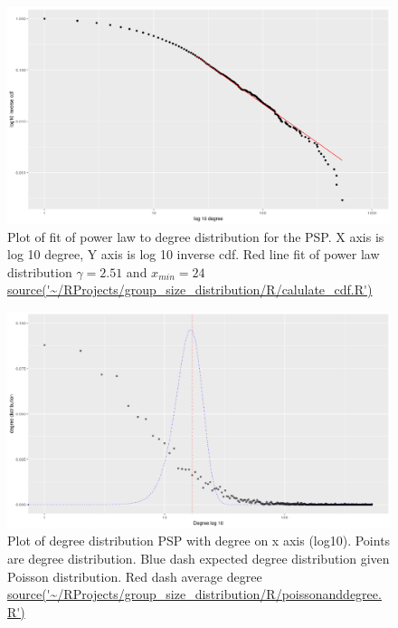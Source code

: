 \begin{figure}
    \centering
    \includegraphics[width=\linewidth]{images/Rplot01_poweRlaw_ggplot.png}
    \caption{Plot of fit of power law to degree distribution for the PSP. X axis is log 10 degree, Y axis is log 10 inverse cdf. Red line fit of power law distribution $\gamma= 2.51$ and $x_{min}=24$ \url{source('~/RProjects/group_size_distribution/R/calulate_cdf.R')}}
    \label{fig:poweRlaw plot ggplot2}
\end{figure}




\begin{figure}
    \centering
    \includegraphics[width=\textwidth]{images/Rplot_poisson_plotted_on_degreedistribution.png}
    \caption{Plot of degree distribution PSP with degree on x axis (log10). Points are degree distribution. Blue dash expected degree distribution given Poisson distribution. Red dash average degree \url{source('~/RProjects/group_size_distribution/R/poissonanddegree.R')}}
    \label{fig:PSP degree powerlaw poisson}
\end{figure}

